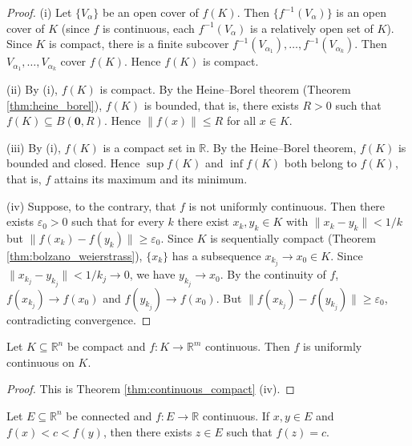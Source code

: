 \begin{proof}
(i) Let $\{V_\alpha\}$ be an open cover of $f(K)$. Then $\{f^{-1}(V_\alpha)\}$ is an open cover of $K$ (since $f$ is continuous, each $f^{-1}(V_\alpha)$ is a relatively open set of $K$). Since $K$ is compact, there is a finite subcover $f^{-1}(V_{\alpha_1}), \dots, f^{-1}(V_{\alpha_k})$. Then $V_{\alpha_1}, \dots, V_{\alpha_k}$ cover $f(K)$. Hence $f(K)$ is compact.

(ii) By (i), $f(K)$ is compact. By the Heine--Borel theorem (Theorem \ref{thm:heine_borel}), $f(K)$ is bounded, that is, there exists $R > 0$ such that $f(K) \subseteq B(\mathbf{0}, R)$. Hence $\|f(x)\| \le R$ for all $x \in K$.

(iii) By (i), $f(K)$ is a compact set in $\mathbb{R}$. By the Heine--Borel theorem, $f(K)$ is bounded and closed. Hence $\sup f(K)$ and $\inf f(K)$ both belong to $f(K)$, that is, $f$ attains its maximum and its minimum.

(iv) Suppose, to the contrary, that $f$ is not uniformly continuous. Then there exists $\varepsilon_0 > 0$ such that for every $k$ there exist $x_k, y_k \in K$ with $\|x_k - y_k\| < 1/k$ but $\|f(x_k) - f(y_k)\| \ge \varepsilon_0$. Since $K$ is sequentially compact (Theorem \ref{thm:bolzano_weierstrass}), $\{x_k\}$ has a subsequence $x_{k_j} \to x_0 \in K$. Since $\|x_{k_j} - y_{k_j}\| < 1/k_j \to 0$, we have $y_{k_j} \to x_0$. By the continuity of $f$, $f(x_{k_j}) \to f(x_0)$ and $f(y_{k_j}) \to f(x_0)$. But $\|f(x_{k_j}) - f(y_{k_j})\| \ge \varepsilon_0$, contradicting convergence.
\end{proof}

\begin{corollary}\label{cor:heine_cantor}
Let $K \subseteq \mathbb{R}^n$ be compact and $f: K \to \mathbb{R}^m$ continuous. Then $f$ is uniformly continuous on $K$.
\end{corollary}

\begin{proof}
This is Theorem \ref{thm:continuous_compact} (iv).
\end{proof}

\begin{theorem}\label{thm:intermediate_value_general}
Let $E \subseteq \mathbb{R}^n$ be connected and $f: E \to \mathbb{R}$ continuous. If $x, y \in E$ and $f(x) < c < f(y)$, then there exists $z \in E$ such that $f(z) = c$.
\end{theorem}

